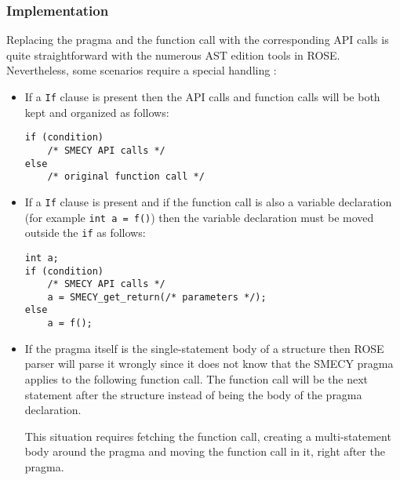 \documentclass [A4]{article}
\begin{document}
	\subsubsection{Implementation} Replacing the pragma and the function call with the corresponding API calls is quite straightforward with the numerous AST edition tools in ROSE. Nevertheless, some scenarios require a special handling :
	\begin{itemize}
		\item If a \verb+If+ clause is present then the API calls and function calls will be both kept and organized as follows:
		\begin{lstlisting}[frame=none, numbers=none]
if (condition)
	/* SMECY API calls */
else
	/* original function call */
		\end{lstlisting}
		\item If a \verb+If+ clause is present and if the function call is also a variable declaration (for example \verb+int a = f()+) then the variable declaration must be moved outside the \verb+if+ as follows:
		\begin{lstlisting}[frame=none, numbers=none]
int a;
if (condition)
	/* SMECY API calls */
	a = SMECY_get_return(/* parameters */);
else
	a = f();
		\end{lstlisting}
		\item If the pragma itself is the single-statement body of a structure then ROSE parser will parse it wrongly since it does not know that the SMECY pragma applies to the following function call. The function call will be the next statement after the structure instead of being the body of the pragma declaration. 
		
		This situation requires fetching the function call, creating a multi-statement body around the pragma and moving the function call in it, right after the pragma.
	\end{itemize}
	
\end{document}
